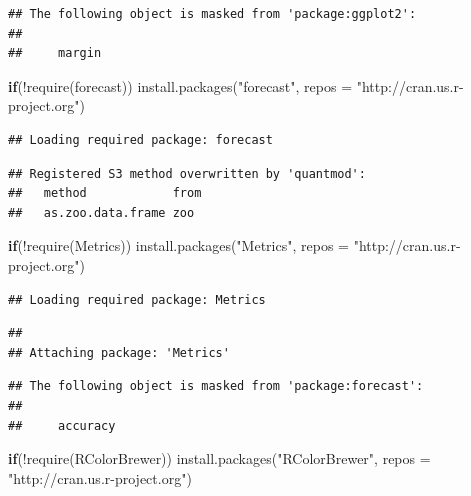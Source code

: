 \documentclass[
]{article}
\newenvironment{Shaded}{}{}
\newcommand{\AttributeTok}[1]{\textcolor[rgb]{0.49,0.56,0.16}{#1}}
\newcommand{\ControlFlowTok}[1]{\textcolor[rgb]{0.00,0.44,0.13}{\textbf{#1}}}
\newcommand{\FunctionTok}[1]{\textcolor[rgb]{0.02,0.16,0.49}{#1}}
\newcommand{\NormalTok}[1]{#1}
\newcommand{\SpecialCharTok}[1]{\textcolor[rgb]{0.25,0.44,0.63}{#1}}
\newcommand{\StringTok}[1]{\textcolor[rgb]{0.25,0.44,0.63}{#1}}
\begin{document}
\begin{verbatim}
## The following object is masked from 'package:ggplot2':
## 
##     margin
\end{verbatim}

\begin{Shaded}
\begin{Highlighting}[]
\ControlFlowTok{if}\NormalTok{(}\SpecialCharTok{!}\FunctionTok{require}\NormalTok{(forecast)) }\FunctionTok{install.packages}\NormalTok{(}\StringTok{"forecast"}\NormalTok{, }
                                     \AttributeTok{repos =} \StringTok{"http://cran.us.r{-}project.org"}\NormalTok{)}
\end{Highlighting}
\end{Shaded}

\begin{verbatim}
## Loading required package: forecast
\end{verbatim}

\begin{verbatim}
## Registered S3 method overwritten by 'quantmod':
##   method            from
##   as.zoo.data.frame zoo
\end{verbatim}

\begin{Shaded}
\begin{Highlighting}[]
\ControlFlowTok{if}\NormalTok{(}\SpecialCharTok{!}\FunctionTok{require}\NormalTok{(Metrics)) }\FunctionTok{install.packages}\NormalTok{(}\StringTok{"Metrics"}\NormalTok{, }
                                     \AttributeTok{repos =} \StringTok{"http://cran.us.r{-}project.org"}\NormalTok{)}
\end{Highlighting}
\end{Shaded}

\begin{verbatim}
## Loading required package: Metrics
\end{verbatim}

\begin{verbatim}
## 
## Attaching package: 'Metrics'
\end{verbatim}

\begin{verbatim}
## The following object is masked from 'package:forecast':
## 
##     accuracy
\end{verbatim}

\begin{Shaded}
\begin{Highlighting}[]
\ControlFlowTok{if}\NormalTok{(}\SpecialCharTok{!}\FunctionTok{require}\NormalTok{(RColorBrewer)) }\FunctionTok{install.packages}\NormalTok{(}\StringTok{"RColorBrewer"}\NormalTok{, }
                                     \AttributeTok{repos =} \StringTok{"http://cran.us.r{-}project.org"}\NormalTok{)}
\end{Highlighting}
\end{Shaded}
\end{document}
